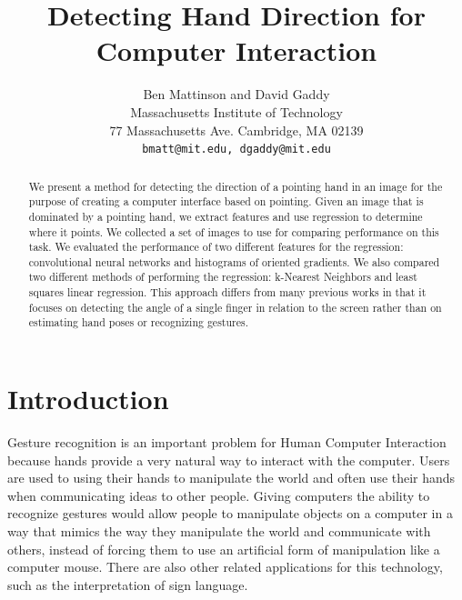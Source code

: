 \documentclass[10pt,twocolumn,letterpaper]{article}
\begin{document}
\title{Detecting Hand Direction for Computer Interaction}

\author{Ben Mattinson and David Gaddy\\
Massachusetts Institute of Technology\\
77 Massachusetts Ave. Cambridge, MA 02139\\
{\tt\small bmatt@mit.edu, dgaddy@mit.edu}
}

\maketitle

\begin{abstract}
We present a method for detecting the direction of a pointing hand in an image for the purpose of creating a computer interface based on pointing.  Given an image that is dominated by a pointing hand, we extract features and use regression to determine where it points.  We collected a set of images to use for comparing performance on this task.  We evaluated the performance of two different features for the regression: convolutional neural networks and histograms of oriented gradients.  We also compared two different methods of performing the regression: k-Nearest Neighbors and least squares linear regression.  This approach differs from many previous works in that it focuses on detecting the angle of a single finger in relation to the screen rather than on estimating hand poses or recognizing gestures.

\end{abstract}

\section{Introduction}

Gesture recognition is an important problem for Human Computer Interaction because hands provide a very natural way to interact with the computer. Users are used to using their hands to manipulate the world and often use their hands when communicating ideas to other people. Giving computers the ability to recognize gestures would allow people to manipulate objects on a computer in a way that mimics the way they manipulate the world and communicate with others, instead of forcing them to use an artificial form of manipulation like a computer mouse. There are also other related applications for this technology, such as the interpretation of sign language.
\end{document}
